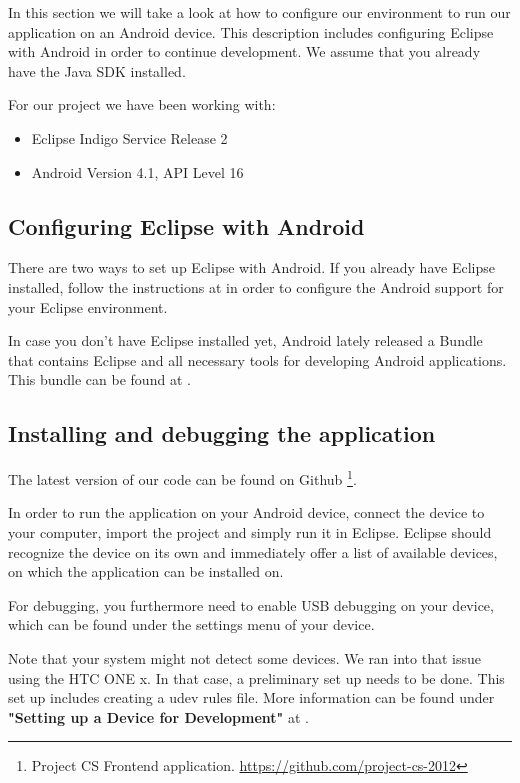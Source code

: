 In this section we will take a look at how to configure
our environment to run our application on an Android device. 
This description includes configuring Eclipse with Android in order to continue development. 
We assume that you already have the Java SDK installed.

For our project we have been working with:
\begin{itemize}
\item Eclipse Indigo Service Release 2
\item Android Version 4.1, API Level 16
\end{itemize}

\subsection{Configuring Eclipse with Android}
There are two ways to set up Eclipse with Android.
If you already have Eclipse installed, follow
the instructions at \cite{plugin} in order to configure the 
Android support for your Eclipse environment.

In case you don't have Eclipse installed yet, Android
lately released a Bundle that contains Eclipse and all 
necessary tools for developing Android applications.
This bundle can be found at \cite{bundle}.

\subsection{Installing and debugging the application}
The latest version of our code can be found on Github \footnote{Project CS Frontend application. \url{https://github.com/project-cs-2012}}.

In order to run the application on your Android device, connect the device
to your computer, import the project and simply run it in Eclipse. 
Eclipse should recognize the device on its own and immediately offer a list
of available devices, on which the application can be installed on.

For debugging, you furthermore need to enable USB debugging on your device,
which can be found under the settings menu of your device.

Note that your system might not detect some devices. We ran into that issue
using the HTC ONE x. In that case, a preliminary set up needs to be done.
This set up includes creating a udev rules file. More information
can be found under \textbf{"Setting up a Device for Development"} at
\cite{hardware}.



